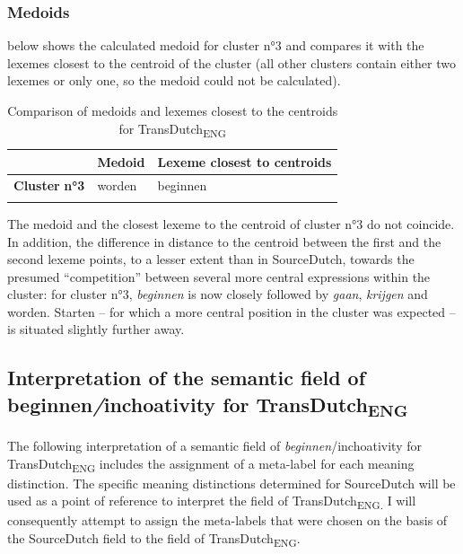\subsubsection{Medoids}
\label{sec:4.3.3.2}  
 below shows the calculated medoid for cluster n°3 and compares it with the lexemes closest to the centroid of the cluster (all other clusters contain either two lexemes or only one, so the medoid could not be calculated).

\begin{table}
\caption{\label{tab:4:15} Comparison of medoids and lexemes closest to the centroids for TransDutch\textsubscript{ENG}}
\begin{tabularx}{\textwidth}{XXl} 
\lsptoprule
& \textbf{Medoid} & \textbf{Lexeme} \textbf{closest} \textbf{to} \textbf{centroids}\\
\midrule
\textbf{Cluster} \textbf{n°3} & worden & beginnen\\
\lspbottomrule
\end{tabularx}
\end{table}

The medoid and the closest lexeme to the centroid of cluster n°3 do not coincide. In addition, the difference in distance to the centroid between the first and the second lexeme points, to a lesser extent than in SourceDutch, towards the presumed ``competition'' between several more central expressions within the cluster: for cluster n°3, \textit{beginnen} is now closely followed by \textit{gaan}, \textit{krijgen} and worden. Starten – for which a more central position in the cluster was expected – is situated slightly further away.

\subsection{Interpretation of the semantic field of beginnen\textit{/}inchoativity for TransDutch\textsubscript{ENG}}
\label{sec:4.3.4}  
The following interpretation of a semantic field of \textit{beginnen}/inchoativity for TransDutch\textsubscript{ENG} includes the assignment of a meta-label for each meaning distinction. The specific meaning distinctions determined for SourceDutch will be used as a point of reference to interpret the field of TransDutch\textsubscript{ENG.} I will consequently attempt to assign the meta-labels that were chosen on the basis of the SourceDutch field to the field of TransDutch\textsubscript{ENG}.

